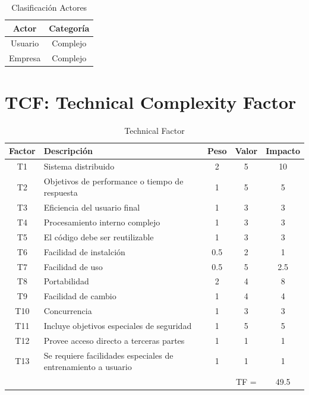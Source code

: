 \documentclass[12pt, a4paper, titlepage]{article}
\begin{document}
\begin{table}[h]
	\begin{center}
		\begin{tabular}{|c|c|}
			\hline
			Actor & Categoría \\ \hline
			Usuario & Complejo \\ \hline
			Empresa & Complejo \\ \hline
			
		\end{tabular}
		\caption{Clasificación Actores}
	\end{center}
\end{table}

\section{TCF: Technical Complexity Factor}

\begin{table}[h]
	\begin{center}
		\begin{tabular}{|c|p{10cm}|c|c|c|}
			\hline
			Factor & Descripción & Peso & Valor & Impacto \\ \hline
			T1 & Sistema distribuido & 2 & 5 & 10 \\ \hline
			T2 & Objetivos de performance o tiempo de respuesta & 1 & 5 & 5 \\ \hline
			T3 & Eficiencia del usuario final & 1 & 3 & 3 \\ \hline
			T4 & Procesamiento interno complejo & 1 & 3 & 3 \\ \hline
			T5 & El código debe ser reutilizable & 1 & 3 & 3 \\ \hline
			T6 & Facilidad de instalción & 0.5 & 2 & 1 \\ \hline
			T7 & Facilidad de uso & 0.5 & 5 & 2.5 \\ \hline
			T8 & Portabilidad & 2 & 4 & 8 \\ \hline
			T9 & Facilidad de cambio & 1 & 4 & 4 \\ \hline
			T10 & Concurrencia & 1 & 3 & 3 \\ \hline
			T11 & Incluye objetivos especiales de seguridad & 1 & 5 & 5 \\ \hline
			T12 & Provee acceso directo a terceras partes & 1 & 1 & 1 \\ \hline
			T13 & Se requiere facilidades especiales de entrenamiento a usuario & 1 & 1 & 1 \\ \hline
			& & & TF = & 49.5 \\ \hline

	
	
	\end{tabular}
	\caption{Technical Factor}
	\end{center}
\end{table}
\end{document}
